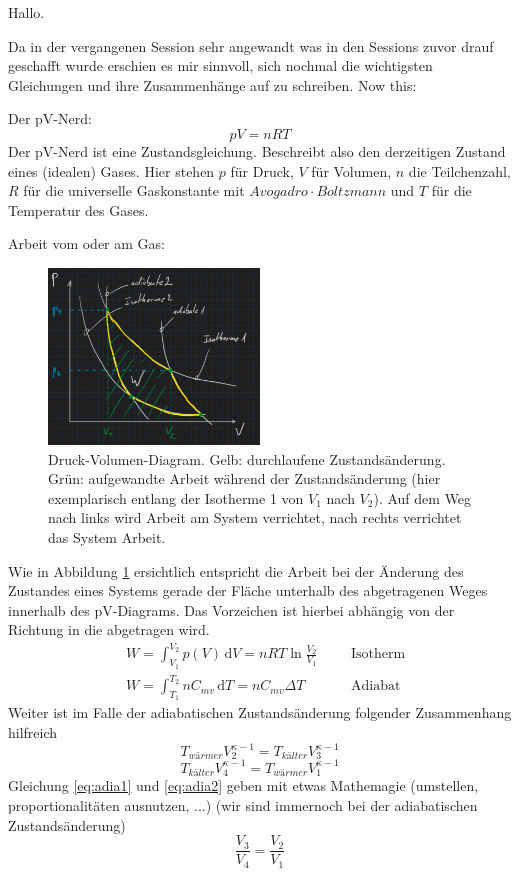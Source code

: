 Hallo.

Da in der vergangenen Session sehr angewandt was in den Sessions zuvor drauf geschafft wurde erschien es mir sinnvoll,
sich nochmal die wichtigsten Gleichungen und ihre Zusammenhänge auf zu schreiben. Now this:

Der pV-Nerd:
\begin{equation}
    pV=nRT
\end{equation}
Der pV-Nerd ist eine Zustandsgleichung. Beschreibt also den derzeitigen Zustand eines (idealen) Gases. Hier stehen \(p\)
für Druck, \(V\) für Volumen, \(n\) die Teilchenzahl, \(R\) für die universelle Gaskonstante mit \(Avogadro \cdot Boltzmann\)
und \(T\) für die Temperatur des Gases.

Arbeit vom oder am Gas:
\begin{figure}[h]
    \centering
    \includegraphics[width=0.5\textwidth]{entries/8/pVwork.jpg}
    \caption{Druck-Volumen-Diagram. Gelb: durchlaufene Zustandsänderung. Grün: aufgewandte Arbeit während der Zustandsänderung (hier exemplarisch entlang der Isotherme 1 von \(V_1\) nach \(V_2\)). Auf dem Weg nach links wird Arbeit am System verrichtet, nach rechts verrichtet das System Arbeit.}
    \label{fig:pVwork}
\end{figure}
Wie in Abbildung \ref{fig:pVwork} ersichtlich entspricht die Arbeit bei der Änderung des Zustandes eines Systems gerade
der Fläche unterhalb des abgetragenen Weges innerhalb des pV-Diagrams. Das Vorzeichen ist hierbei abhängig von der Richtung
in die abgetragen wird.
\begin{align}
    &W = \int_{V_1}^{V_2} p(V) \,\mathrm{d}V = nRT\ln{\frac{V_2}{V_1}} && &\text{Isotherm}\\
    &W = \int_{T_1}^{T_2} nC_{mv} \,\mathrm{d}T = nC_{mv}\Delta T && &\text{Adiabat}
\end{align}
Weiter ist im Falle der adiabatischen Zustandsänderung folgender Zusammenhang hilfreich
\begin{equation}
    T_{wärmer}V_2^{\kappa -1} = T_{kälter}V_3^{\kappa -1}
    \label{eq:adia1}
\end{equation}
\begin{equation}  
    T_{kälter}V_4^{\kappa -1} = T_{wärmer}V_1^{\kappa -1}
    \label{eq:adia2}
\end{equation}
Gleichung \ref{eq:adia1} und \ref{eq:adia2} geben mit etwas Mathemagie (umstellen, proportionalitäten ausnutzen, ...)
(wir sind immernoch bei der adiabatischen Zustandsänderung)
\begin{equation}
    \frac{V_3}{V_4} = \frac{V_2}{V_1}
\end{equation}

